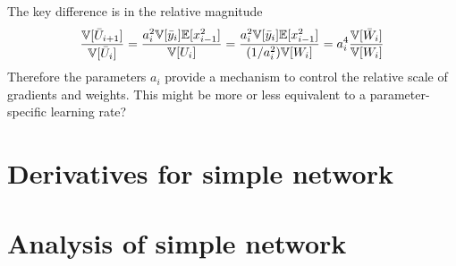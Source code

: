 The key difference is in the relative magnitude
\begin{align}
\frac{\mathbb{V}[\bar{U}_{i+1}]}{\mathbb{V}[\bar{U}_{i}]}
= \frac {a_{i}^2 \mathbb{V}[\bar{y}_{i}] \mathbb{E}[x_{i-1}^2]} {\mathbb{V}[U_{i}]}
= \frac {a_{i}^2 \mathbb{V}[\bar{y}_{i}] \mathbb{E}[x_{i-1}^2]} {(1/a_{i}^2) \mathbb{V}[W_{i}]}
= a_{i}^4 \frac{\mathbb{V}[\bar{W}_{i}]}{\mathbb{V}[W_{i}]}
\end{align}
Therefore the parameters $a_{i}$ provide a mechanism to control the relative scale of gradients and weights.
This might be more or less equivalent to a parameter-specific learning rate?


\begin{subappendices}

\section{Derivatives for simple network}
\label{sec:simple_derivatives}


\section{Analysis of simple network}
\label{sec:simple_analysis}


\end{subappendices}
